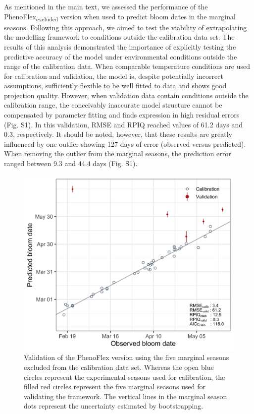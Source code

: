 \documentclass[
]{article}
\begin{document}
As mentioned in the main text, we assessed the performance of the
PhenoFlex\textsubscript{excluded} version when used to predict bloom
dates in the marginal seasons. Following this approach, we aimed to test
the viability of extrapolating the modelling framework to conditions
outside the calibration data set. The results of this analysis
demonstrated the importance of explicitly testing the predictive
accuracy of the model under environmental conditions outside the range
of the calibration data. When comparable temperature conditions are used
for calibration and validation, the model is, despite potentially
incorrect assumptions, sufficiently flexible to be well fitted to data
and shows good projection quality. However, when validation data contain
conditions outside the calibration range, the conceivably inaccurate
model structure cannot be compensated by parameter fitting and finds
expression in high residual errors (Fig. S1). In this validation, RMSE
and RPIQ reached values of 61.2 days and 0.3, respectively. It should be
noted, however, that these results are greatly influenced by one outlier
showing 127 days of error (observed versus predicted). When removing the
outlier from the marginal seasons, the prediction error ranged between
9.3 and 44.4 days (Fig. S1).

\begin{figure}

{\centering \includegraphics[width=1\linewidth]{figures/final_figures/Figure_S1} 

}

\caption{Validation of the PhenoFlex version using the five marginal seasons excluded from the calibration data set. Whereas the open blue circles represent the experimental seasons used for calibration, the filled red circles represent the five marginal seasons used for validating the framework. The vertical lines in the marginal season dots represent the uncertainty estimated by bootstrapping.}\label{fig:fig_s4}
\end{figure}
\end{document}
